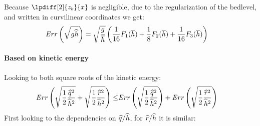 Because $\lpdiff[2]{z_b}{x}$ is negligible, due to the regularization of the bedlevel, and written in curvilinear coordinates we get:
%
\begin{align}
    {\mathit Err}&\left(\sqrt{g\widehat{h}}\right)  = \sqrt{\frac{g}{\overline{h}}} \left(  \frac{1}{16} F_1(\overline{h}) +  \frac{1}{8} F_2(\overline{h}) + \frac{1}{16} F_3(\overline{h}) \right)
\end{align}

\paragraph*{Based on kinetic energy}
Looking to both square roots of the kinetic energy:
\begin{align}
{\mathit Err} \left( \sqrt{\frac{1}{2} \frac{\widehat{q}^2}{\widehat{h}^2}}
+ \sqrt{\frac{1}{2} \frac{\widehat{r}^2}{\widehat{h}^2}} \right) \leq
 &{\mathit Err} \left( \sqrt{\frac{1}{2} \frac{\widehat{q}^2}{\widehat{h}^2}} \right)
    +
    {\mathit Err}\left( \sqrt{\frac{1}{2} \frac{\widehat{r}^2}{\widehat{h}^2}} \right)
\end{align}
%
First looking to the dependencies on $\widehat{q}/\widehat{h}$, for $\widehat{r}/\widehat{h}$ it is similar:
